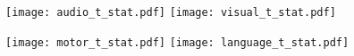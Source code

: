 \documentclass{article}
\begin{document}
\pagestyle{empty}

\begin{preview}
    \texttt{[image: audio\_t\_stat.pdf]}%
    \hfill%
    \texttt{[image: visual\_t\_stat.pdf]}

    \texttt{[image: motor\_t\_stat.pdf]}%
    \hfill%
    \texttt{[image: language\_t\_stat.pdf]}

\end{preview}
\end{document}
